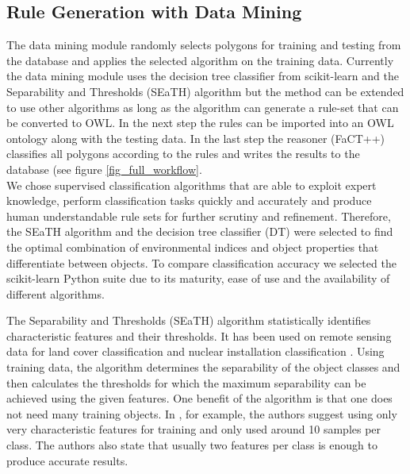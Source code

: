 \documentclass[authoryear, review,12pt,number]{elsarticle}
\begin{document}
\subsection{Rule Generation with Data Mining}
The data mining module randomly selects polygons for training and testing from
the database and applies the selected algorithm on the training data. 
%
Currently the data mining module uses the decision tree classifier from
scikit-learn \citep{scikit-learn} and the Separability and Thresholds (SEaTH)
algorithm \citep{Nussbaum2006} but the method can be extended to use other
algorithms as long as the algorithm can generate a rule-set that can be
converted to OWL. In the next step the rules can be imported into an OWL
ontology along with the testing data. In the last step the reasoner (FaCT++)
classifies all polygons according to the rules and writes the results to the
database (see figure \ref{fig_full_workflow}.
\\
We chose supervised classification algorithms that
are able to exploit expert knowledge, perform classification tasks quickly and
accurately and produce human understandable rule sets for further scrutiny and
refinement. Therefore, the SEaTH algorithm and the decision tree classifier
(DT) were selected to find the optimal combination of environmental indices and
object properties that differentiate between objects. To compare classification
accuracy we selected the scikit-learn Python suite \citep{scikit-learn} due to
its maturity, ease of use and the availability of different algorithms. 

The Separability and Thresholds (SEaTH) algorithm \citep{Nussbaum2006}
statistically identifies characteristic features and their thresholds. It has
been used on remote sensing data for land cover classification \citep{Gao2011}
and nuclear installation classification \citep{Nussbaum2006}. Using training
data, the algorithm determines the separability of the object classes and then
calculates the thresholds for which the maximum separability can be achieved
using the given features. One benefit of the algorithm is that one does not
need many training objects.  In  \cite{Nussbaum2006}, for example, the authors
suggest using only very characteristic features for training and only used
around 10 samples per class. The authors also state that usually two features
per class is enough to produce accurate results.\\
\end{document}
